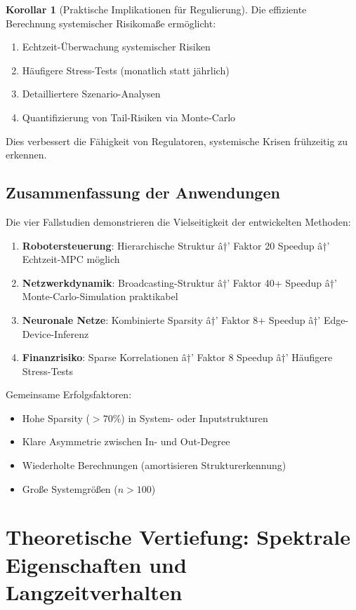 ﻿\documentclass[a4paper,12pt]{report}
\theoremstyle{definition}
\newtheorem{korollar}{Korollar}
\begin{document}
	\begin{korollar}[Praktische Implikationen für Regulierung]
		Die effiziente Berechnung systemischer Risikomaße ermöglicht:
		\begin{enumerate}
			\item Echtzeit-Überwachung systemischer Risiken
			\item Häufigere Stress-Tests (monatlich statt jährlich)
			\item Detailliertere Szenario-Analysen
			\item Quantifizierung von Tail-Risiken via Monte-Carlo
		\end{enumerate}
		
		Dies verbessert die Fähigkeit von Regulatoren, systemische Krisen frühzeitig zu erkennen.
	\end{korollar}
	
	\section{Zusammenfassung der Anwendungen}
	
	Die vier Fallstudien demonstrieren die Vielseitigkeit der entwickelten Methoden:
	
	\begin{enumerate}
		\item \textbf{Robotersteuerung}: Hierarchische Struktur â†’ Faktor 20 Speedup â†’ Echtzeit-MPC möglich
		\item \textbf{Netzwerkdynamik}: Broadcasting-Struktur â†’ Faktor 40+ Speedup â†’ Monte-Carlo-Simulation praktikabel
		\item \textbf{Neuronale Netze}: Kombinierte Sparsity â†’ Faktor 8+ Speedup â†’ Edge-Device-Inferenz
		\item \textbf{Finanzrisiko}: Sparse Korrelationen â†’ Faktor 8 Speedup â†’ Häufigere Stress-Tests
	\end{enumerate}
	
	Gemeinsame Erfolgsfaktoren:
	\begin{itemize}
		\item Hohe Sparsity ($> 70\%$) in System- oder Inputstrukturen
		\item Klare Asymmetrie zwischen In- und Out-Degree
		\item Wiederholte Berechnungen (amortisieren Strukturerkennung)
		\item Große Systemgrößen ($n > 100$)
	\end{itemize}
	
	\chapter{Theoretische Vertiefung: Spektrale Eigenschaften und Langzeitverhalten}
	
\end{document}
